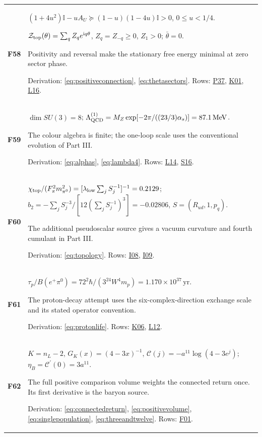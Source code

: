\documentclass[aps,prx,onecolumn,10pt,notitlepage,nofootinbib,longbibliography]{revtex4-2}
\numberwithin{equation}{section}
\numberwithin{table}{section}
\newcommand{\Id}{\mathbb I}
\newcommand{\ii}{\mathrm i}
\newcommand{\MeV}{\,\mathrm{MeV}}
\begin{document}
\begin{longtable}{@{}>{\raggedright\arraybackslash}p{}>{\raggedright\arraybackslash}p{}@{}}
\hypertarget{formula-F58}{}\textbf{F58}\label{formula:F58} & $(1+4u^2)\Id-uA_U\succeq(1-u)(1-4u)\Id>0$, $0\leq u<1/4$.\par $\mathcal Z_{\rm top}(\theta)=\sum_qZ_qe^{\ii q\theta}$, $Z_q=Z_{-q}\geq0$, $Z_1>0$; $\bar\theta=0$.\par
Positivity and reversal make the stationary free energy minimal at zero sector phase.\par
Derivation: \eqref{eq:positiveconnection}, \eqref{eq:thetasectors}. Rows: \hyperlink{row-P37}{P37}, \hyperlink{row-K01}{K01}, \hyperlink{row-L16}{L16}.\\[7pt]
\hypertarget{formula-F59}{}\textbf{F59}\label{formula:F59} & $\dim SU(3)=8$; $\Lambda_{\rm QCD}^{(1)}=M_Z\exp[-2\pi/((23/3)\alpha_s)]=87.1\MeV$.\par
The colour algebra is finite; the one-loop scale uses the conventional evolution of Part III.\par
Derivation: \eqref{eq:alphas}, \eqref{eq:lambda4}. Rows: \hyperlink{row-L14}{L14}, \hyperlink{row-S16}{S16}.\\[7pt]
\hypertarget{formula-F60}{}\textbf{F60}\label{formula:F60} & $\chi_{\rm top}/(F_\pi^2m_{\pi^0}^2)=[\lambda_{\rm low}\sum_jS_j^{-1}]^{-1}=0.2129$; $b_2=-\sum_jS_j^{-3}/[12(\sum_jS_j^{-1})^3]=-0.02806$, $S=(R_{ud},1,p_q)$.\par
The additional pseudoscalar source gives a vacuum curvature and fourth cumulant in Part III.\par
Derivation: \eqref{eq:topology}. Rows: \hyperlink{row-I08}{I08}, \hyperlink{row-I09}{I09}.\\[7pt]
\hypertarget{formula-F61}{}\textbf{F61}\label{formula:F61} & $\tau_p/B(e^+\pi^0)=72^2\hbar/(3^{24}W^4m_p)=1.170\times10^{37}\,\mathrm{yr}$.\par
The proton-decay attempt uses the six-complex-direction exchange scale and its stated operator convention.\par
Derivation: \eqref{eq:protonlife}. Rows: \hyperlink{row-K06}{K06}, \hyperlink{row-L12}{L12}.\\[7pt]
\hypertarget{formula-F62}{}\textbf{F62}\label{formula:F62} & $K=n_L-2$, $G_K(x)=(4-3x)^{-1}$, $\mathcal C(j)=-a^{11}\log(4-3e^j)$; $\eta_B=\mathcal C^\prime(0)=3a^{11}$.\par
The full positive comparison volume weights the connected return once. Its first derivative is the baryon source.\par
Derivation: \eqref{eq:connectedreturn}, \eqref{eq:positivevolume}, \eqref{eq:singlepopulation}, \eqref{eq:threeandtwelve}. Rows: \hyperlink{row-F01}{F01}.\\[7pt]

\end{longtable}
\end{document}
